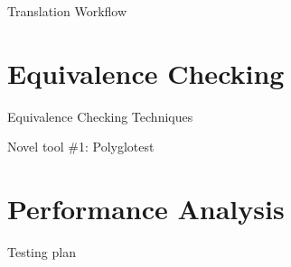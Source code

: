 \documentclass[10pt,aspectratio=169]{beamer}
\begin{document}
\begin{frame}{Translation Workflow}
\end{frame}




\section{Equivalence Checking}

\begin{frame}{Equivalence Checking Techniques}
\end{frame}

\begin{frame}{Novel tool \#1: Polyglotest}
\end{frame}




\section{Performance Analysis}

\begin{frame}{Testing plan}
\end{frame}




\end{document}
